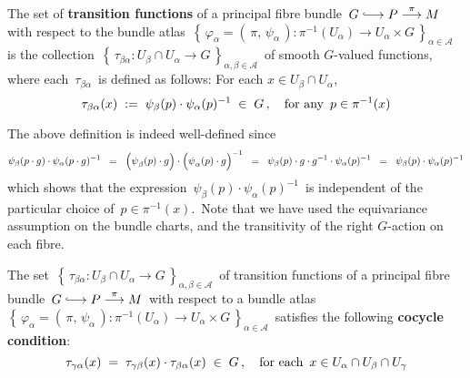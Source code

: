 
\vskip 0.5cm
\begin{definition}
\mbox{}
\vskip 0.2cm
\noindent
The set of \textbf{transition functions} of a principal fibre bundle
\,$G \longhookrightarrow P \overset{\pi}{\longrightarrow} M$\,
with respect to the bundle atlas
\,$\left\{\,\varphi_{\alpha} = (\,\pi,\,\psi_{\alpha}\,) : \pi^{-1}(U_{\alpha}) \longrightarrow U_{\alpha} \times G\,\right\}_{\alpha\in\mathcal{A}}$\,
is the collection
\,$\left\{\,\tau_{\beta\alpha} : U_{\beta} \cap U_{\alpha} \longrightarrow G\,\right\}_{\alpha,\beta\in\mathcal{A}}$\,
of smooth $G$-valued functions, where each
\,$\tau_{\beta\alpha}$\,
is defined as follows:
For each $x \in U_{\beta} \cap U_{\alpha}$,
\begin{equation*}
\tau_{\beta\alpha}(x)
\; := \;
	\psi_{\beta}(p) \cdot \psi_{\alpha}(p)^{-1}
\; \in \;
	G\,,
\quad
\textnormal{for any \,$p \in \pi^{-1}(x)$}
\end{equation*}
\end{definition}


\begin{remark}
\mbox{}
\vskip 0.2cm
\noindent
The above definition is indeed well-defined since
\begin{equation*}
\psi_{\beta}(p \cdot g) \cdot \psi_{\alpha}(p \cdot g)^{-1}
\;\; = \;\;
	\left(\overset{{\color{white}.}}{\psi}_{\beta}(p)\cdot g\right) \cdot \left(\overset{{\color{white}.}}{\psi}_{\alpha}(p)\cdot g\right)^{-1}
\;\; = \;\;
	\psi_{\beta}(p) \cdot g \cdot g^{-1} \cdot \psi_{\alpha}(p)^{-1}
\;\; = \;\;
	\psi_{\beta}(p) \cdot \psi_{\alpha}(p)^{-1}
\end{equation*}
which shows that the expression
\,$\psi_{\beta}(p) \cdot \psi_{\alpha}(p)^{-1}$\,
is independent of the particular choice of \,$p \in \pi^{-1}(x)$.\,
Note that we have used the equivariance assumption on the bundle charts,
and the transitivity of the right $G$-action on each fibre.
\end{remark}


\vskip 0.5cm
\begin{proposition}
\mbox{}
\vskip 0.2cm
\noindent
The set
\,$\left\{\,\tau_{\beta\alpha} : U_{\beta} \cap U_{\alpha} \longrightarrow G\,\right\}_{\alpha,\beta\in\mathcal{A}}$\,
of transition functions of a principal fibre bundle
\,$G \longhookrightarrow P \overset{\pi}{\longrightarrow} M$\,
with respect to a bundle atlas
\,$\left\{\,\varphi_{\alpha} = (\,\pi,\,\psi_{\alpha}\,) : \pi^{-1}(U_{\alpha}) \longrightarrow U_{\alpha} \times G\,\right\}_{\alpha\in\mathcal{A}}$\,
satisfies the following \textbf{cocycle condition}:
\begin{equation*}
\tau_{\gamma\alpha}(x) \; = \; \tau_{\gamma\beta}(x) \cdot \tau_{\beta\alpha}(x) \; \in \; G\,,
\quad
\textnormal{for each \,$x \in U_{\alpha} \cap U_{\beta} \cap U_{\gamma}$}
\end{equation*}
\end{proposition}

